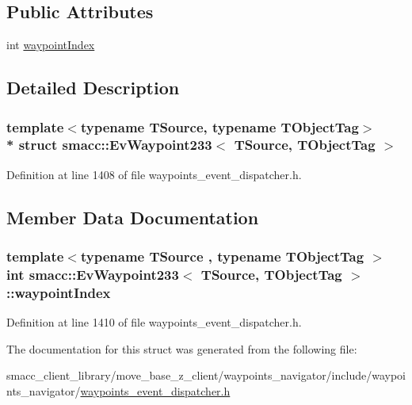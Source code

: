 \subsection*{Public Attributes}
\begin{DoxyCompactItemize}
\item 
int \hyperlink{structsmacc_1_1EvWaypoint233_a5dfa8877e6aed69aa7265514d71743c1}{waypoint\+Index}
\end{DoxyCompactItemize}


\subsection{Detailed Description}
\subsubsection*{template$<$typename T\+Source, typename T\+Object\+Tag$>$\\*
struct smacc\+::\+Ev\+Waypoint233$<$ T\+Source, T\+Object\+Tag $>$}



Definition at line 1408 of file waypoints\+\_\+event\+\_\+dispatcher.\+h.



\subsection{Member Data Documentation}
\subsubsection[{\texorpdfstring{waypoint\+Index}{waypointIndex}}]{\setlength{\rightskip}{0pt plus 5cm}template$<$typename T\+Source , typename T\+Object\+Tag $>$ int {\bf smacc\+::\+Ev\+Waypoint233}$<$ T\+Source, T\+Object\+Tag $>$\+::waypoint\+Index}\hypertarget{structsmacc_1_1EvWaypoint233_a5dfa8877e6aed69aa7265514d71743c1}{}\label{structsmacc_1_1EvWaypoint233_a5dfa8877e6aed69aa7265514d71743c1}


Definition at line 1410 of file waypoints\+\_\+event\+\_\+dispatcher.\+h.



The documentation for this struct was generated from the following file\+:\begin{DoxyCompactItemize}
\item 
smacc\+\_\+client\+\_\+library/move\+\_\+base\+\_\+z\+\_\+client/waypoints\+\_\+navigator/include/waypoints\+\_\+navigator/\hyperlink{waypoints__event__dispatcher_8h}{waypoints\+\_\+event\+\_\+dispatcher.\+h}\end{DoxyCompactItemize}
